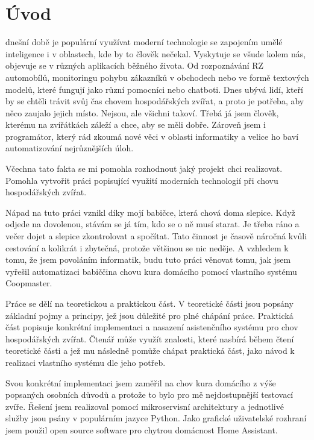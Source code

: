 \chapter{Úvod}\label{ch:uvod}

dnešní době je populární využívat moderní technologie se zapojením umělé inteligence i v oblastech, kde by to člověk nečekal.
Vyskytuje se všude kolem nás, objevuje se v různých aplikacích běžného života.
Od rozpoznávání RZ automobílů, monitoringu pohybu zákazníků v obchodech nebo ve formě textových modelů, které fungují jako různí pomocníci nebo chatboti.
Dnes ubývá lidí, kteří by se chtěli trávit svůj čas chovem hospodářských zvířat, a proto je potřeba, aby něco zaujalo jejich místo.
Nejsou, ale všichni takoví.
Třebá já jsem člověk, kterému na zvířátkách záleží a chce, aby se měli dobře.
Zároveň jsem i programátor, který rád zkoumá nové věci v oblasti informatiky a velice ho baví automatizování nejrůznějších úloh.

Včechna tato fakta se mi pomohla rozhodnout jaký projekt chci realizovat.
Pomohla vytvořit práci popisující využití moderních technologií při chovu hospodářských zvířat.

Nápad na tuto práci vznikl díky mojí babičce, která chová doma slepice.
Když odjede na dovolenou, stávám se já tím, kdo se o ně musí starat.
Je třeba ráno a večer dojet a slepice zkontrolovat a spočítat.
Tato činnost je časově náročná kvůli cestování a kolikrát i zbytečná, protože většinou se nic neděje.
A vzhledem k tomu, že jsem povoláním informatik, budu tuto práci věnovat tomu, jak jsem vyřešil automatizaci babiččina chovu kura domácího pomocí vlastního systému Coopmaster.\newline

Práce se dělí na teoretickou a praktickou část.
V teoretické části jsou popsány základní pojmy a principy, jež jsou důležité pro plné chápání práce.
Praktická část popisuje konkrétní implementaci a nasazení asistenčního systému pro chov hospodářských zvířat.
Čtenář může využít znalosti, které nasbírá během čtení teoretické části a jež mu následně pomůže chápat praktická část, jako návod k realizaci vlastního systému dle jeho potřeb.\newline

Svou konkrétní implementaci jsem zaměřil na chov kura domácího z výše popsaných osobních důvodů a protože to bylo pro mě nejdostupnější testovací zvíře.
Řešení jsem realizoval pomocí mikroservisní architektury a jednotlivé služby jsou psány v populárním jazyce Python.
Jako grafické uživatelské rozhraní jsem použil open source software pro chytrou domácnost Home Assistant.
